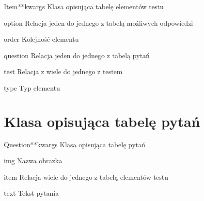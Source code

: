 \documentclass[letterpaper,10pt,polish]{manual}
\begin{document}
\hypertarget{dbmodel.Item}{}\begin{classdesc}{Item}{**kwargs}
Klasa opisująca tabelę elementów testu

\hypertarget{dbmodel.Item.option}{}\begin{memberdesc}{option}
Relacja jeden do jednego z tabelą możliwych odpowiedzi
\end{memberdesc}

\hypertarget{dbmodel.Item.order}{}\begin{memberdesc}{order}
Kolejność elementu
\end{memberdesc}

\hypertarget{dbmodel.Item.question}{}\begin{memberdesc}{question}
Relacja jeden do jednego z tabelą pytań
\end{memberdesc}

\hypertarget{dbmodel.Item.test}{}\begin{memberdesc}{test}
Relacja z wiele do jednego z testem
\end{memberdesc}

\hypertarget{dbmodel.Item.type}{}\begin{memberdesc}{type}
Typ elementu
\end{memberdesc}
\end{classdesc}
\hypertarget{dbmodel-question}{}

\section{Klasa opisująca tabelę pytań}

\hypertarget{dbmodel.Question}{}\begin{classdesc}{Question}{**kwargs}
Klasa opisująca tabelę pytań

\hypertarget{dbmodel.Question.img}{}\begin{memberdesc}{img}
Nazwa obrazka
\end{memberdesc}

\hypertarget{dbmodel.Question.item}{}\begin{memberdesc}{item}
Relacja wiele do jednego z tabelą elementów testu
\end{memberdesc}

\hypertarget{dbmodel.Question.text}{}\begin{memberdesc}{text}
Tekst pytania
\end{memberdesc}
\end{classdesc}
\hypertarget{dbmodel-option}{}
\end{document}
